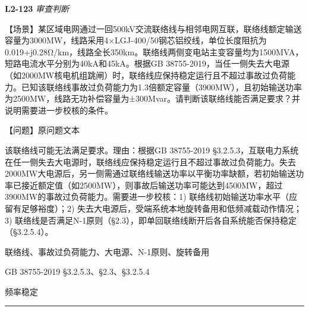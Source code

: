 \documentclass[12pt,a4paper]{ctexart}
\begin{document}
\noindent\textbf{L2-123} \hfill \textit{审查判断}
\begin{description}[leftmargin=1.5em,style=nextline,font=\normalfont]
  \item[Q:] 【场景】某区域电网通过一回500kV交流联络线与相邻电网互联，联络线额定输送容量为3000MW，线路采用4×LGJ-400/50钢芯铝绞线，单位长度阻抗为0.019+j0.28Ω/km，线路全长350km。联络线两侧变电站主变容量均为1500MVA，短路电流水平分别为40kA和45kA。根据GB 38755-2019，当任一侧失去大电源（如2000MW核电机组跳闸）时，联络线应保持稳定运行且不超过事故过负荷能力。已知该联络线事故过负荷能力为1.3倍额定容量（3900MW），且初始输送功率为2500MW，线路无功补偿容量为±300Mvar。请判断该联络线能否满足要求？并说明需要进一步校核的条件。

【问题】原问题文本
  \item[A:] 该联络线可能无法满足要求。理由：根据GB 38755-2019 §3.2.5.3，互联电力系统在任一侧失去大电源时，联络线应保持稳定运行且不超过事故过负荷能力。失去2000MW大电源后，另一侧需通过联络线输送功率以平衡功率缺额，若初始输送功率已接近额定值（如2500MW），则事故后输送功率可能达到4500MW，超过3900MW的事故过负荷能力。需要进一步校核：1) 联络线初始输送功率水平（应留有足够裕度）；2) 失去大电源后，受端系统本地旋转备用和低频减载动作情况；3) 联络线是否满足N-1原则（§2.3），即单回联络线断开后各自系统能否保持稳定（§3.2.5.4）。
  \item[KW:] 联络线、事故过负荷能力、大电源、N-1原则、旋转备用
  \item[Std:] GB 38755-2019 §3.2.5.3、§2.3、§3.2.5.4
  \item[Topic:] 频率稳定
\end{description}
\vspace{4pt}
\hrule\vspace{6pt}
\end{document}
